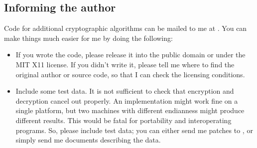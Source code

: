 \documentclass{howto}
\begin{document}
\subsection{Informing the author}
Code for additional cryptographic algorithms can be mailed to me at
.  You can make things much easier for me by doing the
following:
\begin{itemize}
\item  If you wrote the code, please release it into the public domain
or under the MIT X11 license.  If you didn't write it, please tell me where
to find the original author or source code, so that I can check the
licensing conditions.
\item  Include some test data.  It is not sufficient to check that
encryption and decryption cancel out properly.  An implementation
might work fine on a single platform, but two machines with
different endianness might produce different results.  This would be
fatal for portability and interoperating programs.  So, please include
test data; you can either send me patches to , or simply
send me documents describing the data.
\end{itemize}
\end{document}

